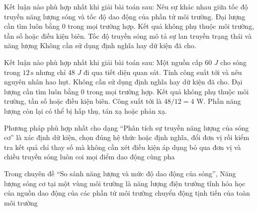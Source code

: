 \begin{ex}
Kết luận nào phù hợp nhất khi giải bài toán sau: Nêu sự khác nhau giữa tốc độ truyền năng lượng sóng và tốc độ dao động của phần tử môi trường.
\choice
{Đại lượng cần tìm luôn bằng 0 trong mọi trường hợp.}
{Kết quả không phụ thuộc môi trường, tần số hoặc điều kiện biên.}
{\True Tốc độ truyền sóng mô tả sự lan truyền trạng thái và năng lượng}
{Không cần sử dụng định nghĩa hay dữ kiện đã cho.}
\end{ex}

\begin{ex}
Kết luận nào phù hợp nhất khi giải bài toán sau: Một nguồn cấp 60 $J$ cho sóng trong $12\,\text{s}$ nhưng chỉ 48 $J$ đi qua tiết diện quan sát. Tính công suất tới và nêu nguyên nhân hao hụt.
\choice
{Không cần sử dụng định nghĩa hay dữ kiện đã cho.}
{Đại lượng cần tìm luôn bằng 0 trong mọi trường hợp.}
{Kết quả không phụ thuộc môi trường, tần số hoặc điều kiện biên.}
{\True Công suất tới là $48/12=4$ W. Phần năng lượng còn lại có thể bị hấp thụ, tán xạ hoặc phản xạ.}
\end{ex}

\begin{ex}
Phương pháp phù hợp nhất cho dạng “Phân tích sự truyền năng lượng của sóng cơ” là
\choice
{\True xác định dữ kiện, chọn đúng hệ thức hoặc định nghĩa, đổi đơn vị rồi kiểm tra kết quả}
{chỉ thay số mà không cần xét điều kiện áp dụng}
{bỏ qua đơn vị và chiều truyền sóng}
{luôn coi mọi điểm dao động cùng pha}
\end{ex}

\begin{ex}
Trong chuyên đề “So sánh năng lượng và mức độ dao động của sóng”, Năng lượng sóng cơ tại một vùng môi trường là năng lượng
\choice
{điện trường tĩnh}
{hóa học của nguồn}
{\True dao động của các phần tử môi trường}
{chuyển động tịnh tiến của toàn môi trường}
\end{ex}

